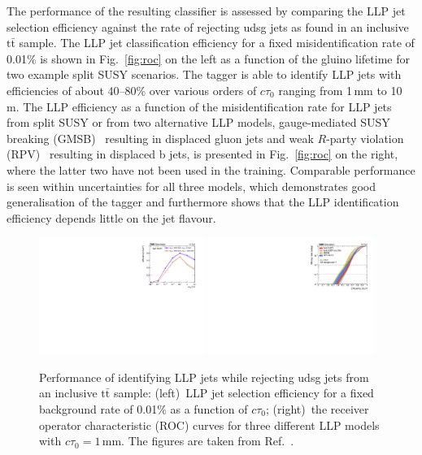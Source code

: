 \documentclass{webofc}
\newcommand{\ctau}{\ensuremath{c\tau_{0}}\xspace}
\newcommand{\ttbar}{\ensuremath{\textrm{t}\bar{\textrm{t}}}\xspace}
\begin{document}
The performance of the resulting classifier is assessed by comparing the LLP jet selection efficiency against the rate of rejecting udsg jets as found in an inclusive \ttbar sample. The LLP jet classification efficiency for a fixed misidentification rate of 0.01\% is shown in Fig.~\ref{fig:roc} on the left as a function of the gluino lifetime for two example split SUSY scenarios. The tagger is able to identify LLP jets with efficiencies of about 40--80\% over various orders of \ctau ranging from 1\,\textrm{mm} to 10\,\textrm{m}. The LLP efficiency as a function of the misidentification rate for LLP jets from split SUSY or from two alternative LLP models, gauge-mediated SUSY breaking (GMSB)~\cite{gmsb} resulting in displaced gluon jets and weak $R$-party violation (RPV)~\cite{rpv} resulting in displaced b jets, is presented in Fig.~\ref{fig:roc} on the right, where the latter two have not been used in the training. Comparable performance is seen within uncertainties for all three models, which demonstrates good generalisation of the tagger and furthermore shows that the LLP identification efficiency depends little on the jet flavour.

\begin{figure}[!ht]
\includegraphics[width=0.48\textwidth]{figs/ctau.pdf}\hspace{0.03\textwidth}
\includegraphics[width=0.48\textwidth]{figs/roc_1.pdf}
\centering
\caption{\label{fig:roc}Performance of identifying LLP jets while rejecting udsg jets from an inclusive \ttbar sample: (left)~LLP jet selection efficiency for a fixed background rate of 0.01\% as a function of \ctau; (right)~the receiver operator characteristic (ROC) curves for three different LLP models with $\ctau=1\,\textrm{mm}$. The figures are taken from Ref.~\cite{CMS-EXO-19-011}.}
\label{fig-3}
\end{figure}
\end{document}
